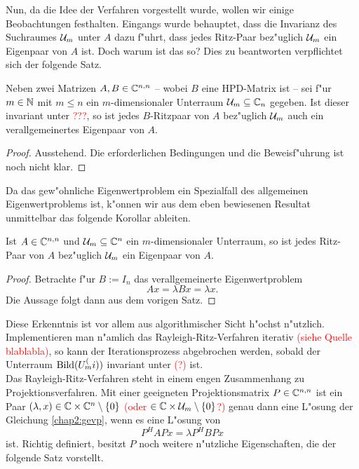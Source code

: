 Nun, da die Idee der Verfahren vorgestellt wurde, wollen wir einige Beobachtungen
festhalten. Eingangs wurde behauptet, dass die Invarianz des Suchraumes $\mathcal{U}_m$ unter
$A$ dazu f"uhrt, dass jedes Ritz-Paar bez"uglich $\mathcal{U}_m$ ein Eigenpaar von $A$ ist.
Doch warum ist das so? Dies zu beantworten verpflichtet sich der folgende Satz.

\begin{thm}
Neben zwei Matrizen $A,B\in\mathbb{C}^{n,n}$ -- wobei $B$ eine HPD-Matrix ist -- sei f"ur
$m\in\mathbb{N}$ mit $m\le n$ ein $m$-dimensionaler Unterraum $\mathcal{U}_m \subseteq \mathbb{C}_n$ gegeben.
Ist dieser invariant unter \textcolor{red}{???}, so ist jedes $B$-Ritzpaar
von $A$ bez"uglich $\mathcal{U}_m$ auch ein verallgemeinertes Eigenpaar von $A$.
\end{thm}

\begin{proof}
Ausstehend. Die erforderlichen Bedingungen und die Beweisf"uhrung ist noch nicht
klar.
\end{proof}

Da das gew"ohnliche Eigenwertproblem ein Spezialfall des allgemeinen Eigenwertproblems
ist, k"onnen wir aus dem eben bewiesenen Resultat unmittelbar das folgende Korollar
ableiten.

\begin{kor}
Ist $A\in\mathbb{C}^{n,n}$ und $\mathcal{U}_m\subseteq \mathbb{C}^n$ ein $m$-dimensionaler Unterraum, so ist
jedes Ritz-Paar von $A$ bez"uglich $\mathcal{U}_m$ ein Eigenpaar von $A$.
\end{kor}

\begin{proof}
Betrachte f"ur $B:=I_n$ das verallgemeinerte Eigenwertproblem
\[
Ax = \lambda Bx = \lambda x.
\]
Die Aussage folgt dann aus dem vorigen Satz.
\end{proof}

Diese Erkenntnis ist vor allem aus algorithmischer Sicht h"ochst n"utzlich. Implementieren
man n"amlich das Rayleigh-Ritz-Verfahren iterativ \textcolor{red}{(siehe Quelle blablabla)}, so
kann der Iterationsprozess abgebrochen werden, sobald der Unterraum $\operatorname{Bild}(U_m^(i))$
invariant unter \textcolor{red}{(?)} ist.\\

Das Rayleigh-Ritz-Verfahren steht in einem engen Zusammenhang zu Projektionsverfahren.
Mit einer geeigneten Projektionsmatrix $P\in\mathbb{C}^{n,n}$ ist ein Paar $(\lambda, x)\in\mathbb{C}\times\mathbb{C}^n \setminus\{0\}$
\textcolor{red}{(oder $\in\mathbb{C}\times\mathcal{U}_m\setminus\{0\}$?)} genau dann eine L"osung
der Gleichung \eqref{chap2:gevp}, wenn es eine L"osung von
\[
P^H APx = \lambda P^H BPx
\]
ist. Richtig definiert, besitzt $P$ noch weitere n"utzliche Eigenschaften, die
der folgende Satz vorstellt.


